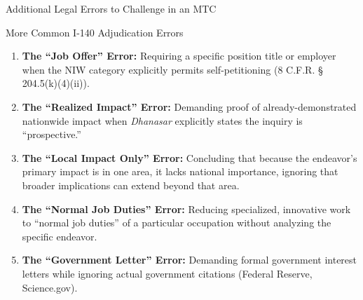 \documentclass[11pt]{beamer}
\begin{document}
	
	\begin{frame}{Additional Legal Errors to Challenge in an MTC}
		\scriptsize
		\begin{block}{More Common I-140 Adjudication Errors}
			\begin{enumerate}
				\item \textbf{The ``Job Offer'' Error:} Requiring a specific position title or employer when the NIW category explicitly permits self-petitioning (8 C.F.R. § 204.5(k)(4)(ii)).
				\item \textbf{The ``Realized Impact'' Error:} Demanding proof of already-demonstrated nationwide impact when \textit{Dhanasar} explicitly states the inquiry is ``prospective.''
				\item \textbf{The ``Local Impact Only'' Error:} Concluding that because the endeavor's primary impact is in one area, it lacks national importance, ignoring that broader implications can extend beyond that area.
				\item \textbf{The ``Normal Job Duties'' Error:} Reducing specialized, innovative work to ``normal job duties'' of a particular occupation without analyzing the specific endeavor.
				\item \textbf{The ``Government Letter'' Error:} Demanding formal government interest letters while ignoring actual government citations (Federal Reserve, Science.gov).
			\end{enumerate}
		\end{block}
	\end{frame}
	
\end{document}
